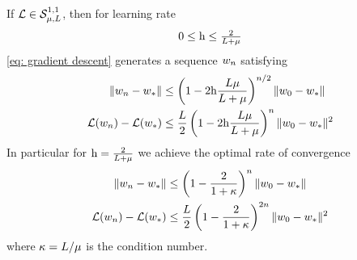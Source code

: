 \begin{theorem}
	\label{thm: gd strong convexity convergence rate}
	If \(\mathcal{L}\in\mathcal{S}^{1,1}_{{\mu},{L}}\), then for learning rate
	\[0 \le \text{h} \le \tfrac{2}{L+\mu}\]
	\ref{eq: gradient descent} generates a sequence \(w_n\) satisfying
	\begin{subequations}
	\begin{align}
		\label{eq: gd strong convexity convergence rate 1}
		\|w_n - w_*\|
		&\le \left(
			1- 2\text{h}\frac{L\mu}{L+\mu}
		\right)^{n/2}
		\|w_0 - w_*\| \\
		\label{eq: gd strong convexity convergence rate 2}
		\mathcal{L}(w_n) - \mathcal{L}(w_*)
		&\le \frac{L}{2} \left(
			1- 2\text{h}\frac{L\mu}{L+\mu}
		\right)^{n}
		\|w_0 - w_*\|^2
	\end{align}
	\end{subequations}
	In particular for \(\text{h}=\tfrac2{L+\mu}\) we achieve the optimal
	rate of convergence
	\begin{subequations}\label{eq: gd strong convexity optimal rate}
	\begin{align}
		\|w_n - w_*\|
		&\le \left(
			1- \frac{2}{1+\kappa}
		\right)^n
		\|w_0 - w_*\| \\
		\mathcal{L}(w_n) - \mathcal{L}(w_*)
		&\le \frac{L}{2} \left(
			1- \frac{2}{1+\kappa}
		\right)^{2n}
		\|w_0 - w_*\|^2
	\end{align}
	\end{subequations}
	where \(\kappa=L/\mu\) is the condition number.
\end{theorem}
